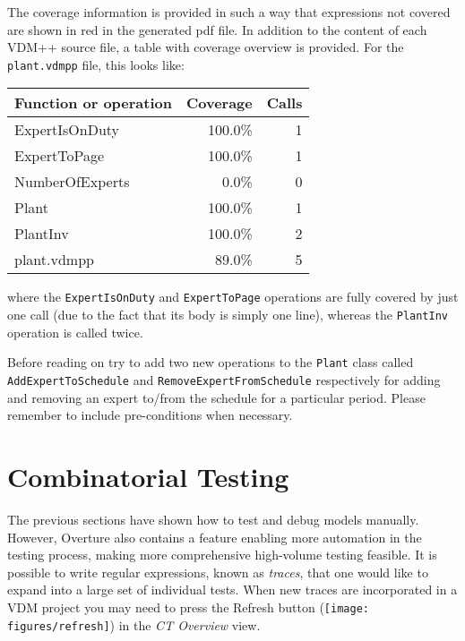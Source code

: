 The coverage information is provided in such a way that expressions not covered are shown in red in the generated pdf file. In addition to the content of each VDM++ source file, a table with coverage overview is provided. For the \texttt{plant.vdmpp} file, this looks like: 

\begin{longtable}{|l|r|r|}
\hline
Function or operation & Coverage & Calls \\
\hline
\hline
ExpertIsOnDuty & 100.0\% & 1 \\
\hline
ExpertToPage & 100.0\% & 1 \\
\hline
NumberOfExperts & 0.0\% & 0 \\
\hline
Plant & 100.0\% & 1 \\
\hline
PlantInv & 100.0\% & 2 \\
\hline
\hline
plant.vdmpp & 89.0\% & 5 \\
\hline
\end{longtable}

\noindent where the \texttt{ExpertIsOnDuty} and \texttt{ExpertToPage} operations are fully covered by just one call (due to the fact that its body is simply one line), whereas the \texttt{PlantInv} operation is called twice.

\begin{myhardexercise}\label{ex:addingfunctionality}
Before reading on try to add two new operations to the \texttt{Plant} class called \texttt{AddExpertToSchedule} and \texttt{RemoveExpertFromSchedule} respectively for adding and removing an expert to/from the schedule for a particular period. Please remember to include pre-conditions when necessary.
\end{myhardexercise}

\newpage

\section{Combinatorial Testing}\label{sec:CT}
The previous sections have shown how to test and debug models manually. However, Overture also contains a feature enabling more automation in the testing process, making more comprehensive high-volume testing feasible. It is possible to write regular expressions, known as \emph{traces}, that one would like to expand into a large set of individual tests. When new traces are incorporated in a VDM project you may need to press the \textsf{Refresh} button
(\texttt{[image: figures/refresh]}) in the \emph{CT Overview} view.

